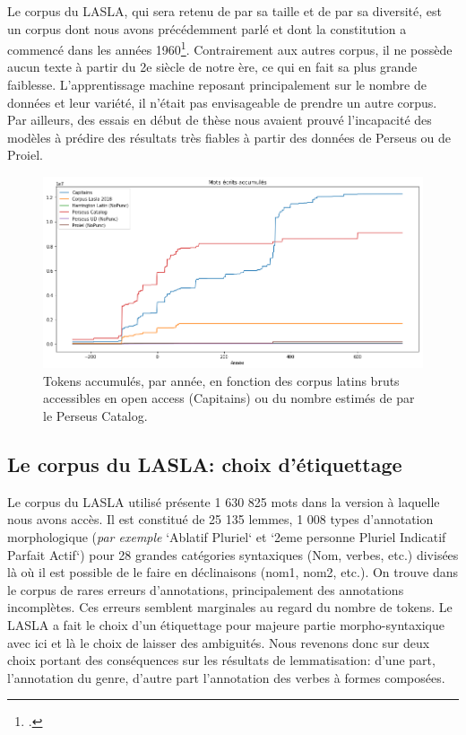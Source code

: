 Le corpus du LASLA, qui sera retenu de par sa taille et de par sa diversité, est un corpus dont nous avons précédemment parlé et dont la constitution a commencé dans les années 1960\footcites{delatte_laboratoire_1961}{BodsonCodification1966}. Contrairement aux autres corpus, il ne possède aucun texte à partir du 2e siècle de notre ère, ce qui en fait sa plus grande faiblesse. L'apprentissage machine reposant principalement sur le nombre de données et leur variété, il n'était pas envisageable de prendre un autre corpus. Par ailleurs, des essais en début de thèse nous avaient prouvé l'incapacité des modèles à prédire des résultats très fiables à partir des données de Perseus ou de Proiel.

\begin{figure}
    \includegraphics[width=\linewidth]{results/lemmatisation/corpus/tokens_per_year.png}
    \caption{Tokens accumulés, par année, en fonction des corpus latins bruts accessibles en open access (Capitains) ou du nombre estimés de par le Perseus Catalog.}
    \label{fig:lemmatisation:corpus-entrainement}
\end{figure}

\subsection{Le corpus du LASLA: choix d'étiquettage}

Le corpus du LASLA utilisé présente 1 630 825 mots dans la version à laquelle nous avons accès. Il est constitué de 25 135 lemmes, 1 008 types d'annotation morphologique (\textit{par exemple}  `Ablatif Pluriel` et `2eme personne Pluriel Indicatif Parfait Actif`) pour 28 grandes catégories syntaxiques (Nom, verbes, etc.) divisées là où il est possible de le faire en déclinaisons (nom1, nom2, etc.). On trouve dans le corpus de rares erreurs d'annotations, principalement des annotations incomplètes. Ces erreurs semblent marginales au regard du nombre de tokens. Le LASLA a fait le choix d'un étiquettage pour majeure partie morpho-syntaxique avec ici et là le choix de laisser des ambiguités. Nous revenons donc sur deux choix portant des conséquences sur les résultats de lemmatisation: d'une part, l'annotation du genre, d'autre part l'annotation des verbes à formes composées.

